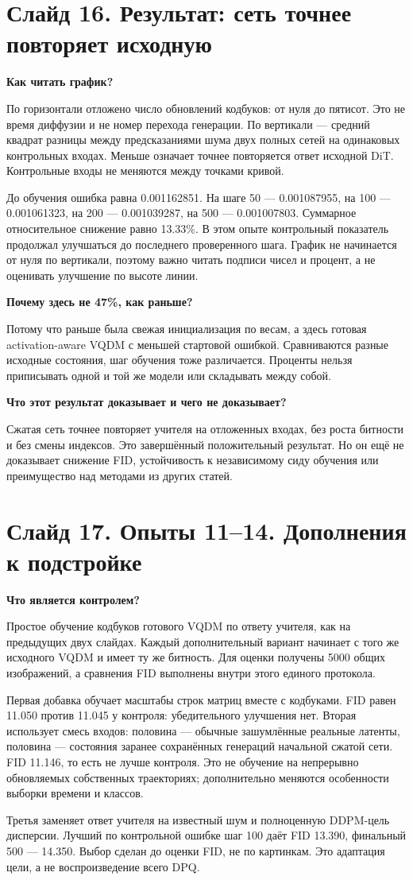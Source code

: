 \documentclass[a4paper,11pt]{article}
\newcommand{\slide}[2]{\clearpage\section*{Слайд #1. #2}}
\newcommand{\question}[1]{\par\textbf{#1}\par}
\begin{document}
\slide{16}{Результат: сеть точнее повторяет исходную}
\question{Как читать график?}
По горизонтали отложено число обновлений кодбуков: от нуля до пятисот.
Это не время диффузии и не номер перехода генерации. По вертикали ---
средний квадрат разницы между предсказаниями шума двух полных сетей
на одинаковых контрольных входах. Меньше означает точнее повторяется
ответ исходной DiT. Контрольные входы не меняются между точками кривой.

До обучения ошибка равна 0.001162851. На шаге 50 --- 0.001087955,
на 100 --- 0.001061323, на 200 --- 0.001039287,
на 500 --- 0.001007803. Суммарное относительное снижение равно 13.33\%.
В этом опыте контрольный показатель продолжал улучшаться до последнего
проверенного шага. График не начинается от нуля по вертикали, поэтому
важно читать подписи чисел и процент, а не оценивать улучшение по высоте линии.

\question{Почему здесь не 47\%, как раньше?}
Потому что раньше была свежая инициализация по весам, а здесь готовая
activation-aware VQDM с меньшей стартовой ошибкой. Сравниваются разные
исходные состояния, шаг обучения тоже различается. Проценты нельзя
приписывать одной и той же модели или складывать между собой.

\question{Что этот результат доказывает и чего не доказывает?}
Сжатая сеть точнее повторяет учителя на отложенных входах, без роста
битности и без смены индексов. Это завершённый положительный результат.
Но он ещё не доказывает снижение FID, устойчивость к независимому сиду
обучения или преимущество над методами из других статей.

\slide{17}{Опыты 11--14. Дополнения к подстройке}
\question{Что является контролем?}
Простое обучение кодбуков готового VQDM по ответу учителя, как на предыдущих
двух слайдах. Каждый дополнительный вариант начинает с того же исходного
VQDM и имеет ту же битность. Для оценки получены 5000 общих изображений,
а сравнения FID выполнены внутри этого единого протокола.

Первая добавка обучает масштабы строк матриц вместе с кодбуками.
FID равен 11.050 против 11.045 у контроля: убедительного улучшения нет.
Вторая использует смесь входов: половина --- обычные зашумлённые реальные
латенты, половина --- состояния заранее сохранённых генераций начальной
сжатой сети. FID 11.146, то есть не лучше контроля. Это не обучение
на непрерывно обновляемых собственных траекториях; дополнительно меняются
особенности выборки времени и классов.

Третья заменяет ответ учителя на известный шум и полноценную DDPM-цель
дисперсии. Лучший по контрольной ошибке шаг 100 даёт FID 13.390,
финальный 500 --- 14.350. Выбор сделан до оценки FID, не по картинкам.
Это адаптация цели, а не воспроизведение всего DPQ.
\end{document}
